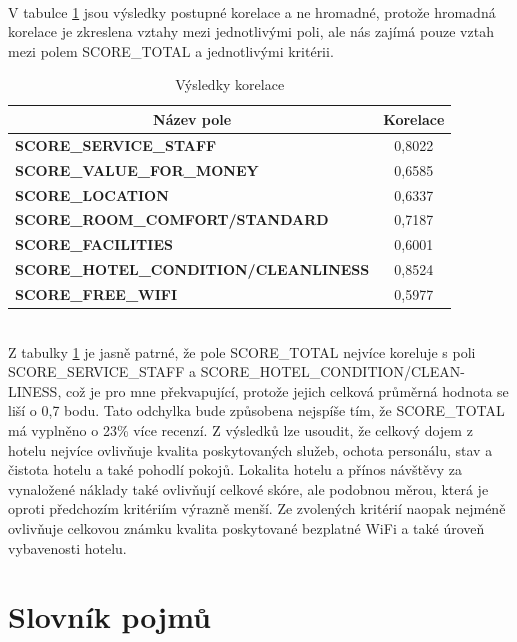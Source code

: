 \documentclass[czech,BP]{thesiskiv}
\begin{document}
 
\mbox{}\\
V tabulce \ref{Korelace_výsledky} jsou výsledky postupné korelace a ne hromadné, protože hromadná korelace je zkreslena vztahy mezi jednotlivými poli, ale nás zajímá pouze vztah mezi polem SCORE\_TOTAL a jednotlivými kritérii.
\begin{table}[h]
	\centering
	\caption{Výsledky korelace}
	\label{Korelace_výsledky}
	\begin{tabular}{|l|c|}
		\hline
		\multicolumn{1}{|c|}{\textbf{Název pole}}    & \textbf{Korelace} \\ \hline
		\textbf{SCORE\_SERVICE\_STAFF}               & 0,8022            \\ \hline
		\textbf{SCORE\_VALUE\_FOR\_MONEY}            & 0,6585            \\ \hline
		\textbf{SCORE\_LOCATION}                     & 0,6337            \\ \hline
		\textbf{SCORE\_ROOM\_COMFORT/STANDARD}       & 0,7187            \\ \hline
		\textbf{SCORE\_FACILITIES}                   & 0,6001            \\ \hline
		\textbf{SCORE\_HOTEL\_CONDITION/CLEANLINESS} & 0,8524            \\ \hline
		\textbf{SCORE\_FREE\_WIFI}                   & 0,5977            \\ \hline
	\end{tabular}
\end{table}
\newpage \mbox{}\\
Z tabulky \ref{Korelace_výsledky} je jasně patrné, že pole SCORE\_TOTAL nejvíce koreluje s poli SCORE\_SERVICE\_STAFF a SCORE\_HOTEL\_CONDITION/CLEAN- LINESS, což je pro mne překvapující, protože jejich celková průměrná hodnota se liší o 0,7 bodu. Tato odchylka bude způsobena nejspíše tím, že SCORE\_TOTAL má vyplněno o 23\% více recenzí. Z výsledků lze usoudit, že celkový dojem z hotelu nejvíce ovlivňuje kvalita poskytovaných služeb, ochota personálu, stav a čistota hotelu a také pohodlí pokojů. Lokalita hotelu a přínos návštěvy za vynaložené náklady také ovlivňují celkové skóre, ale podobnou měrou, která je oproti předchozím kritériím výrazně menší. Ze zvolených kritérií naopak nejméně ovlivňuje celkovou známku kvalita poskytované bezplatné WiFi a také úroveň vybavenosti hotelu. 
%
\chapter{Slovník pojmů}
\end{document}
